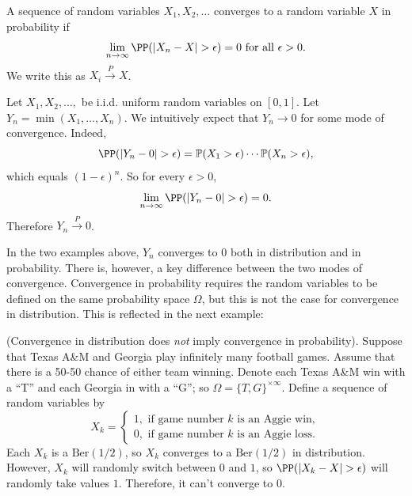 \documentclass{ximera}
\begin{document}
\begin{definition}
A sequence of random variables $X_1,X_2,\ldots$ converges to a random variable $X$ in probability if
$$
\lim_{n\rightarrow \infty} \PP( \vert X_n - X\vert > \epsilon) = 0 \text{ for all } \epsilon >0.
$$ 
We write this as $X_i \stackrel{P}{\rightarrow} X$.
\end{definition}

\begin{example}
Let $X_1,X_2,\ldots,$ be i.i.d. uniform random variables on $[0,1]$. Let $Y_n = \min(X_1,\ldots,X_n)$. We intuitively expect that $Y_n \rightarrow 0$ for some mode of convergence. Indeed, 
$$
\PP( \vert Y_n - 0 \vert > \epsilon) = \mathbb{P}(X_1 > \epsilon) \cdots \mathbb{P}(X_n > \epsilon) ,
$$
which equals $(1-\epsilon)^n$. So for every $\epsilon>0$,
$$
\lim_{n\rightarrow \infty} \PP( \vert Y_n - 0 \vert > \epsilon) = 0.
$$
Therefore $Y_n \stackrel{P}{\rightarrow} 0$.
\end{example}

In the two examples above, $Y_n$ converges to $0$ both in distribution and in probability. There is, however, a key difference between the two modes of convergence. Convergence in probability requires the random variables to be defined on the same probability space $\Omega$, but this is not the case for convergence in distribution. This is reflected in the next example:

\begin{example}\label{DiPr}
(Convergence in distribution does \textit{not} imply convergence in probability). Suppose that Texas A\&M and Georgia play infinitely many football games. Assume that there is a 50-50 chance of either team winning. Denote each Texas A\&M win with a ``T'' and each Georgia in with a ``G''; so $\Omega = \{T,G\}^{\times \infty}$. Define a sequence of random variables by 
$$
X_{k}
 = 
 \begin{cases}
 1, \text{ if game number } k \text{ is an Aggie win},\\
 0, \text{ if game number } k \text{ is an Aggie loss}.
 \end{cases}
$$
Each $X_k$ is a $\textrm{Ber}(1/2)$, so $X_k$ converges to a $\textrm{Ber}(1/2)$ in distribution. However, $X_k$ will randomly switch between $0$ and $1$, so $\PP( \vert X_k - X\vert >\epsilon)$ will randomly take values $1$. Therefore, it can't converge to $0$. 

\end{example}
\end{document}
